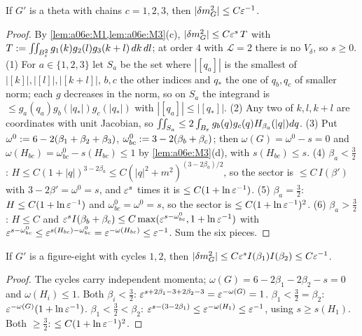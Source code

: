\begin{lemma}[theta]\label{lem:a06e:M5}
If $G'$ is a theta with chains $c=1,2,3$, then $|\delta m^2_G|\le C\varepsilon^{-1}$.
\end{lemma}

\begin{proof}
By \cref{lem:a06e:M1,lem:a06e:M3}(c), $|\delta m^2_G|\le C\varepsilon^s\,T$ with $T:=\iint_{B_{\varepsilon}^2}g_1(k)g_2(l)g_3(k+l)\,dk\,dl$; at order $4$ with $\mathcal L=2$ there is no $V_\delta$, so $s\ge0$. (1) For $a\in\{1,2,3\}$ let $S_a$ be the set where $|[q_a]|$ is the smallest of $|[k]|,|[l]|,|[k+l]|$, $b,c$ the other indices and $q_*$ the one of $q_b,q_c$ of smaller norm; each $g$ decreases in the norm, so on $S_a$ the integrand is $\le g_a(q_a)g_b(|q_*|)g_c(|q_*|)$ with $|[q_a]|\le|[q_*]|$. (2) Any two of $k,l,k+l$ are coordinates with unit Jacobian, so $\iint_{S_a}\le2\int_{B_{\varepsilon}}g_b(q)g_c(q)H_{\beta_a}(|q|)dq$. (3) Put $\omega^0:=6-2(\beta_1+\beta_2+\beta_3)$, $\omega^0_{bc}:=3-2(\beta_b+\beta_c)$; then $\omega(G)=\omega^0-s=0$ and $\omega(H_{bc})=\omega^0_{bc}-s(H_{bc})\le1$ by \cref{lem:a06e:M3}(d), with $s(H_{bc})\le s$. (4) $\beta_a<\frac32$: $H\le C(1+|q|)^{3-2\beta_a}\le C(|q|^2+m^2)^{(3-2\beta_a)/2}$, so the sector is $\le C\,I(\beta')$ with $3-2\beta'=\omega^0=s$, and $\varepsilon^s$ times it is $\le C(1+\ln\varepsilon^{-1})$. (5) $\beta_a=\frac32$: $H\le C(1+\ln\varepsilon^{-1})$ and $\omega^0_{bc}=\omega^0=s$, so the sector is $\le C(1+\ln\varepsilon^{-1})^2$. (6) $\beta_a>\frac32$: $H\le C$ and $\varepsilon^sI(\beta_b+\beta_c)\le C\max(\varepsilon^{s-\omega^0_{bc}},1+\ln\varepsilon^{-1})$ with $\varepsilon^{s-\omega^0_{bc}}\le\varepsilon^{s(H_{bc})-\omega^0_{bc}}=\varepsilon^{-\omega(H_{bc})}\le\varepsilon^{-1}$. Sum the six pieces.
\end{proof}

\begin{lemma}\label{lem:a06e:M6}
If $G'$ is a figure-eight with cycles $1,2$, then $|\delta m^2_G|\le C\varepsilon^sI(\beta_1)I(\beta_2)\le C\varepsilon^{-1}$.
\end{lemma}

\begin{proof}
The cycles carry independent momenta; $\omega(G)=6-2\beta_1-2\beta_2-s=0$ and $\omega(H_i)\le1$. Both $\beta_i<\frac32$: $\varepsilon^{s+2\beta_1-3+2\beta_2-3}=\varepsilon^{-\omega(G)}=1$. $\beta_1<\frac32=\beta_2$: $\varepsilon^{-\omega(G)}(1+\ln\varepsilon^{-1})$. $\beta_1<\frac32<\beta_2$: $\varepsilon^{s-(3-2\beta_1)}\le\varepsilon^{-\omega(H_1)}\le\varepsilon^{-1}$, using $s\ge s(H_1)$. Both $\ge\frac32$: $\le C(1+\ln\varepsilon^{-1})^2$.
\end{proof}

